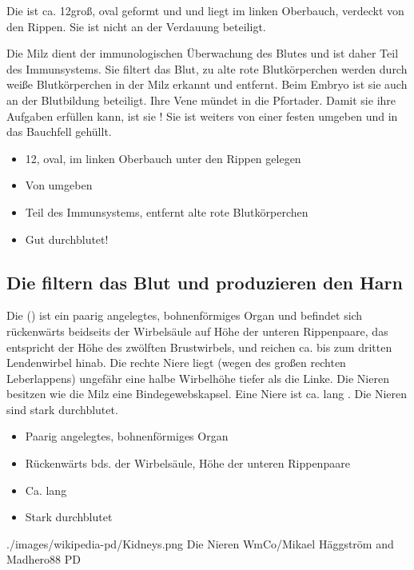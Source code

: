 \TextSlide{\TxBeschreibung}
{
Die  
ist ca. 12\CM* groß, oval geformt und und liegt im
linken Oberbauch, verdeckt von den Rippen. 
Sie ist nicht an der Verdauung beteiligt.

Die Milz dient der immunologischen Überwachung des
Blutes und ist daher Teil des Immunsystems. Sie filtert das
Blut, zu alte rote Blutkörperchen werden durch weiße Blutkörperchen in der
Milz erkannt und entfernt. Beim Embryo ist sie auch an
der Blutbildung beteiligt. Ihre Vene mündet in
die Pfortader.
%
Damit sie ihre Aufgaben erfüllen
kann, ist sie ! 
Sie ist weiters von einer festen 
umgeben und in das Bauchfell gehüllt.
}
{
\begin{itemize}
  \item 12\CM*, oval, im linken Oberbauch unter den Rippen gelegen
  \item Von  umgeben
  \item Teil des Immunsystems, entfernt alte rote Blutkörperchen
  \item Gut durchblutet!
\end{itemize}
}




\subsection{Die  filtern das Blut und produzieren den Harn}

\TextSlidePicture
{\TxBeschreibung}%
{%
Die  
() 
ist ein paarig angelegtes, 
bohnenförmiges Organ 
und befindet sich
rückenwärts
beidseits der Wirbelsäule 
auf Höhe der unteren
Rippenpaare, das entspricht der Höhe 
des zwölften Brustwirbels, 
und reichen ca. bis zum dritten Lendenwirbel hinab.
Die rechte Niere liegt 
(wegen des großen rechten Leberlappens) 
ungefähr eine halbe Wirbelhöhe tiefer als die Linke. 
%
Die Nieren
besitzen wie die Milz eine Bindegewebskapsel. 
Eine Niere ist ca. 
\CM* lang 
%
.
%
Die Nieren sind stark durchblutet.
}%
{
\begin{itemize}
  \item Paarig angelegtes, bohnenförmiges Organ
  \item Rückenwärts
  bds. der Wirbelsäule, 
  Höhe der unteren
  Rippenpaare
  \item Ca. \CM* lang
  \item Stark durchblutet
\end{itemize}}%
{./images/wikipedia-pd/Kidneys.png}%
{Die Nieren}%
{}%
{WmCo/Mikael Häggström and Madhero88}%
{PD}%


